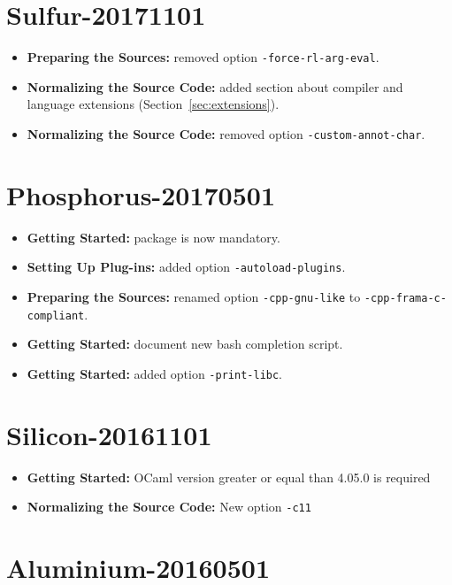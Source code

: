 \section*{Sulfur-20171101}

\begin{itemize}
\item \textbf{Preparing the Sources:} removed option
  \texttt{-force-rl-arg-eval}.
\item \textbf{Normalizing the Source Code:} added section about compiler
  and language extensions (Section~\ref{sec:extensions}).
\item \textbf{Normalizing the Source Code:} removed option
  \texttt{-custom-annot-char}.
\end{itemize}

\section*{Phosphorus-20170501}

\begin{itemize}
\item \textbf{Getting Started:}  package is now mandatory.
\item \textbf{Setting Up Plug-ins:} added option \texttt{-autoload-plugins}.
\item \textbf{Preparing the Sources:} renamed option \texttt{-cpp-gnu-like}
  to \texttt{-cpp-frama-c-compliant}.
\item \textbf{Getting Started:} document new bash completion script.
\item \textbf{Getting Started:} added option \texttt{-print-libc}.
\end{itemize}

\section*{Silicon-20161101}

\begin{itemize}
\item \textbf{Getting Started:} OCaml version greater or equal than 4.05.0 is required
\item \textbf{Normalizing the Source Code:} New option \texttt{-c11}
\end{itemize}

\section*{Aluminium-20160501}

